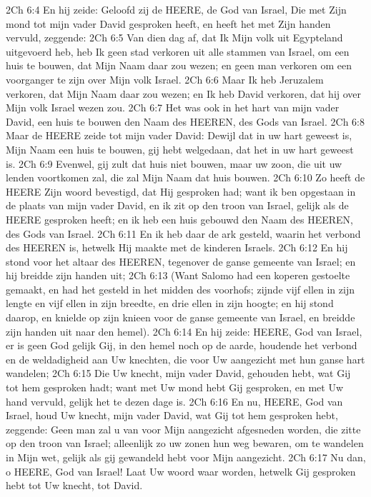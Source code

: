 2Ch 6:4  En hij zeide: Geloofd zij de HEERE, de God van Israel, Die met Zijn mond tot mijn vader David gesproken heeft, en heeft het met Zijn handen vervuld, zeggende:
2Ch 6:5  Van dien dag af, dat Ik Mijn volk uit Egypteland uitgevoerd heb, heb Ik geen stad verkoren uit alle stammen van Israel, om een huis te bouwen, dat Mijn Naam daar zou wezen; en geen man verkoren om een voorganger te zijn over Mijn volk Israel.
2Ch 6:6  Maar Ik heb Jeruzalem verkoren, dat Mijn Naam daar zou wezen; en Ik heb David verkoren, dat hij over Mijn volk Israel wezen zou.
2Ch 6:7  Het was ook in het hart van mijn vader David, een huis te bouwen den Naam des HEEREN, des Gods van Israel.
2Ch 6:8  Maar de HEERE zeide tot mijn vader David: Dewijl dat in uw hart geweest is, Mijn Naam een huis te bouwen, gij hebt welgedaan, dat het in uw hart geweest is.
2Ch 6:9  Evenwel, gij zult dat huis niet bouwen, maar uw zoon, die uit uw lenden voortkomen zal, die zal Mijn Naam dat huis bouwen.
2Ch 6:10  Zo heeft de HEERE Zijn woord bevestigd, dat Hij gesproken had; want ik ben opgestaan in de plaats van mijn vader David, en ik zit op den troon van Israel, gelijk als de HEERE gesproken heeft; en ik heb een huis gebouwd den Naam des HEEREN, des Gods van Israel.
2Ch 6:11  En ik heb daar de ark gesteld, waarin het verbond des HEEREN is, hetwelk Hij maakte met de kinderen Israels.
2Ch 6:12  En hij stond voor het altaar des HEEREN, tegenover de ganse gemeente van Israel; en hij breidde zijn handen uit;
2Ch 6:13  (Want Salomo had een koperen gestoelte gemaakt, en had het gesteld in het midden des voorhofs; zijnde vijf ellen in zijn lengte en vijf ellen in zijn breedte, en drie ellen in zijn hoogte; en hij stond daarop, en knielde op zijn knieen voor de ganse gemeente van Israel, en breidde zijn handen uit naar den hemel).
2Ch 6:14  En hij zeide: HEERE, God van Israel, er is geen God gelijk Gij, in den hemel noch op de aarde, houdende het verbond en de weldadigheid aan Uw knechten, die voor Uw aangezicht met hun ganse hart wandelen;
2Ch 6:15  Die Uw knecht, mijn vader David, gehouden hebt, wat Gij tot hem gesproken hadt; want met Uw mond hebt Gij gesproken, en met Uw hand vervuld, gelijk het te dezen dage is.
2Ch 6:16  En nu, HEERE, God van Israel, houd Uw knecht, mijn vader David, wat Gij tot hem gesproken hebt, zeggende: Geen man zal u van voor Mijn aangezicht afgesneden worden, die zitte op den troon van Israel; alleenlijk zo uw zonen hun weg bewaren, om te wandelen in Mijn wet, gelijk als gij gewandeld hebt voor Mijn aangezicht.
2Ch 6:17  Nu dan, o HEERE, God van Israel! Laat Uw woord waar worden, hetwelk Gij gesproken hebt tot Uw knecht, tot David.

